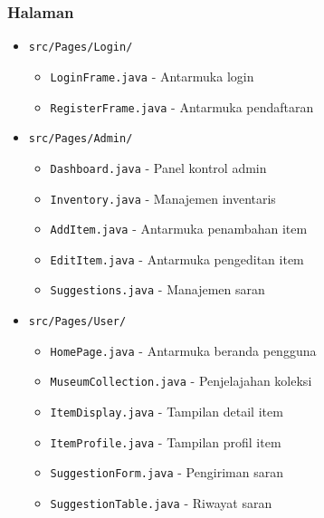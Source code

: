 \documentclass[12pt,a4paper]{article}
\begin{document}
\subsubsection{Halaman}
\begin{itemize}
    \item \texttt{src/Pages/Login/}
    \begin{itemize}
        \item \texttt{LoginFrame.java} - Antarmuka login
        \item \texttt{RegisterFrame.java} - Antarmuka pendaftaran
    \end{itemize}
    
    \item \texttt{src/Pages/Admin/}
    \begin{itemize}
        \item \texttt{Dashboard.java} - Panel kontrol admin
        \item \texttt{Inventory.java} - Manajemen inventaris
        \item \texttt{AddItem.java} - Antarmuka penambahan item
        \item \texttt{EditItem.java} - Antarmuka pengeditan item
        \item \texttt{Suggestions.java} - Manajemen saran
    \end{itemize}
    
    \item \texttt{src/Pages/User/}
    \begin{itemize}
        \item \texttt{HomePage.java} - Antarmuka beranda pengguna
        \item \texttt{MuseumCollection.java} - Penjelajahan koleksi
        \item \texttt{ItemDisplay.java} - Tampilan detail item
        \item \texttt{ItemProfile.java} - Tampilan profil item
        \item \texttt{SuggestionForm.java} - Pengiriman saran
        \item \texttt{SuggestionTable.java} - Riwayat saran
    \end{itemize}
\end{itemize}
\end{document}
